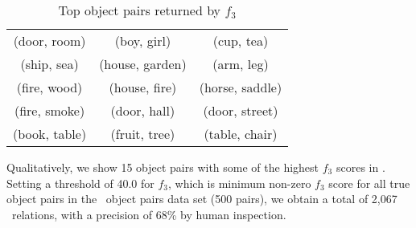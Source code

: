
\begin{table}[th]
\small
	\centering
	\begin{tabular}{|ccc|}
		\hline
		(door, room)  & (boy, girl)     & (cup, tea)      \\
		(ship, sea)   & (house, garden) & (arm, leg)      \\
		(fire, wood)  & (house, fire)   & (horse, saddle) \\
		(fire, smoke) & (door, hall)    & (door, street)  \\
		(book, table) & (fruit, tree)   & (table, chair)  \\ \hline
	\end{tabular}
	\caption{Top object pairs returned by $f_3$}
	\label{tbl:toppairs}
\end{table}
Qualitatively, we show 15 object pairs with some of the highest $f_3$ scores
in .
Setting a threshold of 40.0 for $f_3$, which is minimum non-zero
$f_3$ score for all true object pairs in the \lnear\ object pairs 
data set (500 pairs), we obtain a total of 2,067 \lnear\ relations, with
a precision of 68\% by human inspection.


